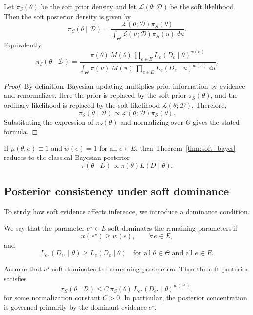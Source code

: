 \documentclass[twoside]{article}
\begin{document}
\begin{thm}
\label{thm:soft_bayes}
Let $\pi_S(\theta)$ be the soft prior density and let $\mathcal{L}(\theta;\mathcal{D})$ be the soft likelihood. Then the soft posterior density is given by
\[
\pi_S(\theta\mid \mathcal{D})
=
\frac{\mathcal{L}(\theta;\mathcal{D})\pi_S(\theta)}
{\int_\Theta \mathcal{L}(u;\mathcal{D})\pi_S(u)\,du}.
\]
Equivalently,
\[
\pi_S(\theta\mid \mathcal{D})
=
\frac{\pi(\theta)\,M(\theta)\,\prod_{e\in E}L_e(D_e\mid \theta)^{w(e)}}
{\int_\Theta \pi(u)\,M(u)\,\prod_{e\in E}L_e(D_e\mid u)^{w(e)}\,du}.
\]
\end{thm}

\begin{proof}
By definition, Bayesian updating multiplies prior information by evidence and renormalizes. Here the prior is replaced by the soft prior $\pi_S(\theta)$, and the ordinary likelihood is replaced by the soft likelihood $\mathcal{L}(\theta;\mathcal{D})$. Therefore,
\[
\pi_S(\theta\mid \mathcal{D}) \propto \mathcal{L}(\theta;\mathcal{D})\pi_S(\theta).
\]
Substituting the expression of $\pi_S(\theta)$ and normalizing over $\Theta$ gives the stated formula.
\end{proof}

\begin{cor}
If $\mu(\theta,e)\equiv 1$ and $w(e)=1$ for all $e\in E$, then Theorem~\ref{thm:soft_bayes} reduces to the classical Bayesian posterior
\[
\pi(\theta\mid D)\propto \pi(\theta)L(D\mid \theta).
\]
\end{cor}

\subsection{Posterior consistency under soft dominance}

To study how soft evidence affects inference, we introduce a dominance condition.

\begin{dfn}
We say that the parameter $e^\star\in E$ soft-dominates the remaining parameters if
\[
w(e^\star)\geq w(e), \qquad \forall e\in E,
\]
and
\[
L_{e^\star}(D_{e^\star}\mid \theta)\geq L_e(D_e\mid \theta)
\quad \text{for all } \theta\in\Theta \text{ and all } e\in E.
\]
\end{dfn}

\begin{thm}
\label{thm:dominant}
Assume that $e^\star$ soft-dominates the remaining parameters. Then the soft posterior satisfies
\[
\pi_S(\theta\mid \mathcal{D})
\leq C\,
\pi_S(\theta)\,L_{e^\star}(D_{e^\star}\mid \theta)^{w(e^\star)},
\]
for some normalization constant $C>0$. In particular, the posterior concentration is governed primarily by the dominant evidence $e^\star$.
\end{thm}
\end{document}
